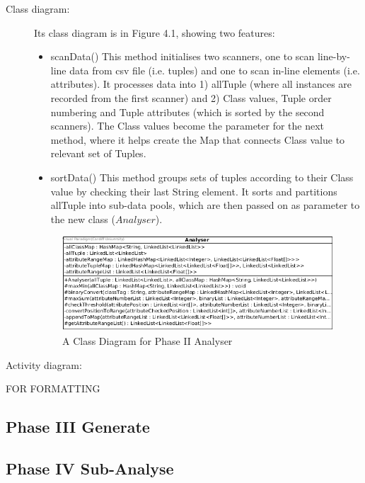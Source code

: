 \begin{description}
\item[Class diagram: ] 

Its class diagram is in Figure 4.1, showing two features:
\begin{itemize}
	\item scanData()
	This method initialises two scanners, one to scan line-by-line data from csv file (i.e. tuples) and one to scan in-line elements (i.e. attributes).
	It processes data into 1) allTuple (where all instances are recorded from the first scanner) and 2) Class values, Tuple order numbering and Tuple attributes (which is sorted by the second scanners).
	The Class values become the parameter for the next method, where it helps create the Map that connects Class value to relevant set of Tuples.
	\item sortData()
	This method groups sets of tuples according to their Class value by checking their last String element. It sorts and partitions allTuple into sub-data pools, which are then passed on as parameter to the new class ($Analyser$).
	
\end{itemize}

\begin{figure}[t]
    \centering
    \includegraphics[width=5in]{figures/class_analyser}
    \caption[A Class Diagram for Phase II Analyser]{A Class Diagram for Phase II Analyser}
    \label{fig:figure4_2}
\end{figure}

\item[Activity diagram: ] 
\end{description}

FOR FORMATTING

\subsection{Phase III Generate}

\subsection{Phase IV Sub-Analyse}

